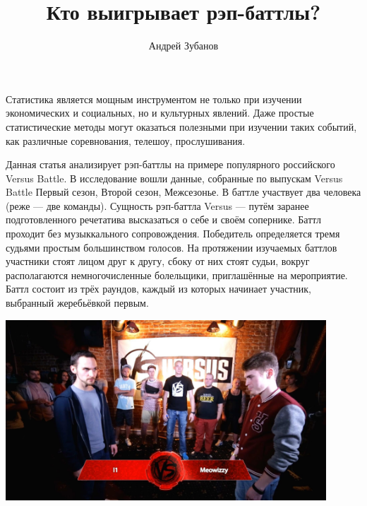 \documentclass[a4paper]{article}
\title{Кто выигрывает рэп-баттлы?}
\author{Андрей Зубанов}
\date{}
\theoremstyle{plain} %
\theoremstyle{definition}
\theoremstyle{remark}
\begin{document}
\maketitle

Статистика является мощным инструментом не только при изучении экономических и социальных, но и культурных явлений. Даже простые статистические методы могут оказаться полезными при изучении таких событий, как различные соревнования, телешоу, прослушивания.

Данная статья анализирует рэп-баттлы на примере популярного российского Versus Battle. В исследование вошли данные, собранные по выпускам Versus Battle Первый сезон, Второй сезон, Межсезонье. В баттле участвует два человека (реже --- две команды). Сущность рэп-баттла Versus --- путём заранее подготовленного речетатива высказаться о себе и своём сопернике. Баттл проходит без музыккального сопровождения. Победитель определяется тремя судьями простым большинством голосов. На протяжении изучаемых баттлов участники стоят лицом друг к другу, сбоку от них стоят судьи, вокруг располагаются немногочисленные болельщики, приглашённые на мероприятие. Баттл состоит из трёх раундов, каждый из которых начинает участник, выбранный жеребьёвкой первым.


\vspace{1cm}

\begin{center}
\includegraphics[width=12cm]{maxresdefault.jpg}
\end{center}
\end{document}
